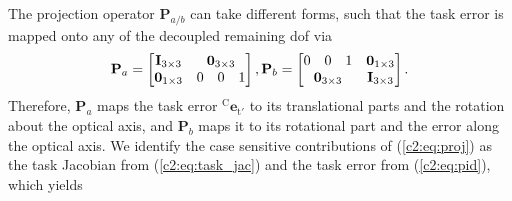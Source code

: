 The projection operator $\mathbf{P}_{a/b}$ can take different forms, such that the task error is mapped onto any of the decoupled remaining \gls{dof} via
\begin{equation}
    \mathbf{P}_a = \begin{bmatrix}
        \mathbf{I}_{3\times3} & \multicolumn{3}{c}{\mathbf{0}_{3\times3}} \\
        \mathbf{0}_{1\times3} & 0 & 0 & 1
    \end{bmatrix},
    \mathbf{P}_b =
    \begin{bmatrix}
        0 & 0 & 1 & \mathbf{0}_{1\times3} \\
        \multicolumn{3}{c}{\mathbf{0}_{3\times3}} & \mathbf{I}_{3\times3}
    \end{bmatrix}.
    \label{c2:eq:projection}
\end{equation}
Therefore, $\mathbf{P}_a$ maps the task error $^\text{C}\mathbf{e}_{\text{t}'}$ to its translational parts and the rotation about the optical axis, and $\mathbf{P}_b$ maps it to its rotational part and the error along the optical axis. We identify the case sensitive contributions of (\eqref{c2:eq:proj}) as the task Jacobian from (\eqref{c2:eq:task_jac}) and the task error from (\eqref{c2:eq:pid}), which yields
